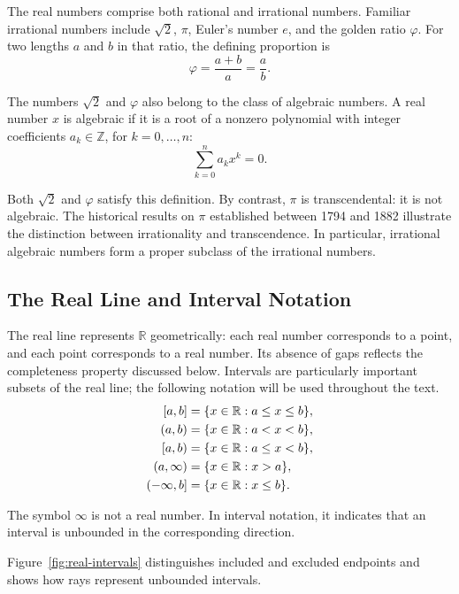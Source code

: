 The real numbers comprise both rational and irrational numbers. Familiar irrational numbers include $\sqrt{2}$, $\pi$, Euler's number $e$,
and the golden ratio $\varphi$. For two lengths $a$ and $b$ in that ratio, the defining proportion is
\[
\varphi = \frac{a+b}{a} = \frac{a}{b}.
\]

The numbers $\sqrt{2}$ and $\varphi$ also belong to the class of algebraic numbers. A real number $x$ is algebraic if it is a root of a
nonzero polynomial with integer coefficients $a_k \in \mathbb{Z}$, for $k = 0, \dots, n$:
\[
\sum_{k=0}^{n} a_k x^k = 0.
\]

Both $\sqrt{2}$ and $\varphi$ satisfy this definition. By contrast, $\pi$ is transcendental: it is not algebraic.
The historical results on $\pi$ established between 1794 and 1882 illustrate the distinction between irrationality and transcendence.
In particular, irrational algebraic numbers form a proper subclass of the irrational numbers.

\subsection{The Real Line and Interval Notation}

The real line represents $\mathbb{R}$ geometrically: each real number corresponds to a point, and each point corresponds to a real number.
Its absence of gaps reflects the completeness property discussed below. Intervals are particularly important subsets of the real line;
the following notation will be used throughout the text.
\[
\begin{aligned}
\relax
[a,b] &= \{x \in \mathbb{R} : a \leq x \leq b\}, \\
(a,b) &= \{x \in \mathbb{R} : a < x < b\}, \\
[a,b) &= \{x \in \mathbb{R} : a \leq x < b\}, \\
(a, \infty) &= \{x \in \mathbb{R} : x > a\}, \\
(-\infty, b] &= \{x \in \mathbb{R} : x \leq b\}.
\end{aligned}
\]

\begin{remark}
The symbol $\infty$ is not a real number. In interval notation, it indicates that an interval is unbounded in the corresponding direction.
\end{remark}

Figure~\ref{fig:real-intervals} distinguishes included and excluded endpoints and shows how rays represent unbounded intervals.

